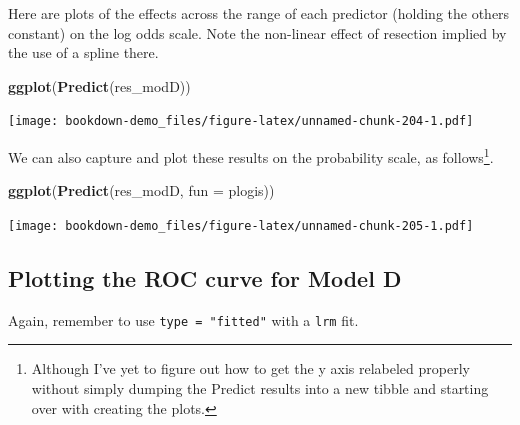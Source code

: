 \documentclass[]{book}
\newenvironment{Shaded}{\begin{snugshade}}{\end{snugshade}}
\newcommand{\KeywordTok}[1]{\textcolor[rgb]{0.13,0.29,0.53}{\textbf{#1}}}
\newcommand{\DataTypeTok}[1]{\textcolor[rgb]{0.13,0.29,0.53}{#1}}
\newcommand{\NormalTok}[1]{#1}
\let\rmarkdownfootnote\footnote%
\def\footnote{\protect\rmarkdownfootnote}
\theoremstyle{definition}
\theoremstyle{definition}
\theoremstyle{definition}
\theoremstyle{remark}
\begin{document}
Here are plots of the effects across the range of each predictor
(holding the others constant) on the log odds scale. Note the non-linear
effect of resection implied by the use of a spline there.

\begin{Shaded}
\begin{Highlighting}[]
\KeywordTok{ggplot}\NormalTok{(}\KeywordTok{Predict}\NormalTok{(res_modD))}
\end{Highlighting}
\end{Shaded}

\texttt{[image: bookdown-demo\_files/figure-latex/unnamed-chunk-204-1.pdf]}

We can also capture and plot these results on the probability scale, as
follows\footnote{Although I've yet to figure out how to get the y axis
  relabeled properly without simply dumping the Predict results into a
  new tibble and starting over with creating the plots.}.

\begin{Shaded}
\begin{Highlighting}[]
\KeywordTok{ggplot}\NormalTok{(}\KeywordTok{Predict}\NormalTok{(res_modD, }\DataTypeTok{fun =}\NormalTok{ plogis))}
\end{Highlighting}
\end{Shaded}

\texttt{[image: bookdown-demo\_files/figure-latex/unnamed-chunk-205-1.pdf]}

\subsection{Plotting the ROC curve for Model
D}\label{plotting-the-roc-curve-for-model-d}

Again, remember to use \texttt{type\ =\ "fitted"} with a \texttt{lrm}
fit.
\end{document}

